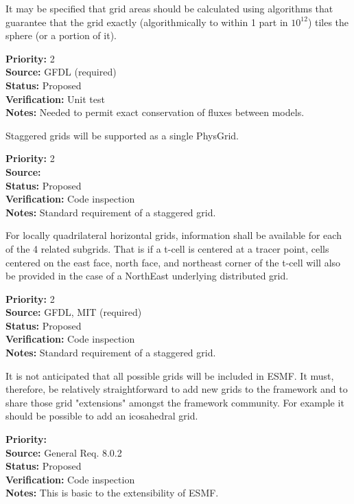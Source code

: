 It may be specified that grid areas should be calculated using algorithms that
guarantee that the grid exactly (algorithmically to within 1 part in $10^{12}$) tiles
the sphere (or a portion of it). 
\begin{reqlist}
{\bf Priority:} 2 \\
{\bf Source:} GFDL (required) \\
{\bf Status:} Proposed \\
{\bf Verification:} Unit test\\
{\bf Notes:} Needed to permit exact conservation of fluxes between models.
\end{reqlist}

Staggered grids will be supported as a single PhysGrid.
\begin{reqlist}
{\bf Priority:} 2 \\
{\bf Source:} \\
{\bf Status:} Proposed \\
{\bf Verification:} Code inspection\\
{\bf Notes:} Standard requirement of a staggered grid.
\end{reqlist}

For locally quadrilateral horizontal grids, information shall be available for
each of the 4 related subgrids.  That is if a t-cell is centered at a tracer
point,  cells centered on the east face, north face, and northeast corner of
the t-cell will also be provided in the case of a NorthEast underlying
distributed grid.
\begin{reqlist}
{\bf Priority:} 2 \\
{\bf Source:} GFDL, MIT (required) \\
{\bf Status:} Proposed \\
{\bf Verification:} Code inspection\\
{\bf Notes:} Standard requirement of a staggered grid.
\end{reqlist}

It is not anticipated that all possible grids will be included in
ESMF. It must, therefore, be relatively straightforward to add
new grids to the framework and to share those grid "extensions"
amongst the framework community. For example it should be possible
to add an icosahedral grid.
\begin{reqlist}
{\bf Priority:} \\
{\bf Source:} General Req. 8.0.2 \\
{\bf Status:} Proposed \\
{\bf Verification:} Code inspection \\
{\bf Notes:} This is basic to the extensibility of ESMF.
\end{reqlist}


